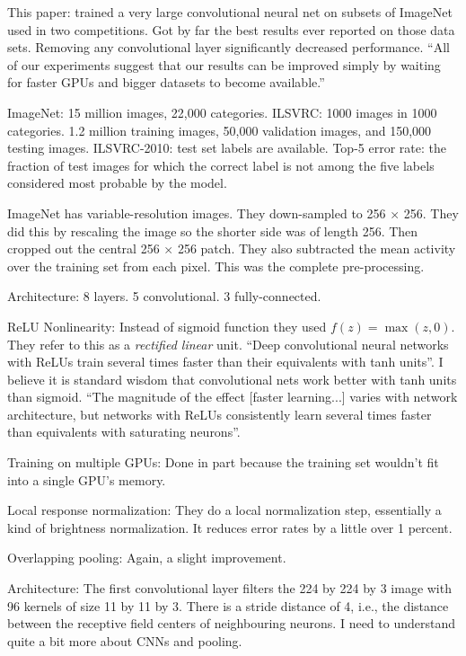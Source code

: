 \documentclass[12pt]{article}
\begin{document}
This paper: trained a very large convolutional neural net on subsets
of ImageNet used in two competitions.  Got by far the best results
ever reported on those data sets.  Removing any convolutional layer
significantly decreased performance.  ``All of our experiments suggest
that our results can be improved simply by waiting for faster GPUs and
bigger datasets to become available.''

ImageNet: 15 million images, 22,000 categories.  ILSVRC: 1000 images
in 1000 categories.  1.2 million training images, 50,000 validation
images, and 150,000 testing images.  ILSVRC-2010: test set labels are
available.  Top-5 error rate: the fraction of test images for which
the correct label is not among the five labels considered most
probable by the model.

ImageNet has variable-resolution images.  They down-sampled to 256
$\times$ 256.  They did this by rescaling the image so the shorter
side was of length 256.  Then cropped out the central 256 $\times$ 256
patch.  They also subtracted the mean activity over the training set
from each pixel.  This was the complete pre-processing.

Architecture: 8 layers.  5 convolutional.  3 fully-connected.

ReLU Nonlinearity: Instead of sigmoid function they used $f(z) =
\max(z, 0)$.  They refer to this as a \emph{rectified linear} unit.
``Deep convolutional neural networks with ReLUs train several times
faster than their equivalents with tanh units''.  I believe it is
standard wisdom that convolutional nets work better with tanh units
than sigmoid.  ``The magnitude of the effect [faster learning...]
varies with network architecture, but networks with ReLUs consistently
learn several times faster than equivalents with saturating neurons''.

Training on multiple GPUs: Done in part because the training set
wouldn't fit into a single GPU's memory.

Local response normalization: They do a local normalization step,
essentially a kind of brightness normalization.  It reduces error
rates by a little over 1 percent.

Overlapping pooling: Again, a slight improvement.

Architecture: The first convolutional layer filters the 224 by 224 by
3 image with 96 kernels of size 11 by 11 by 3.  There is a stride
distance of 4, i.e., the distance between the receptive field centers
of neighbouring neurons.  I need to understand quite a bit more about
CNNs and pooling.
\end{document}
